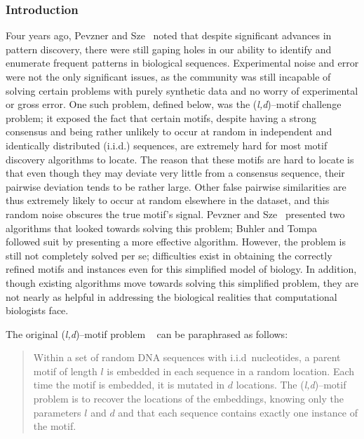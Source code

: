     \subsubsection{Introduction}
        Four years ago, Pevzner and Sze~\cite{pevzner2000combinatorial} noted
    that despite significant advances in pattern discovery,
    there were still gaping holes in our ability to identify and
    enumerate frequent patterns in biological sequences.
    Experimental noise and error were not the only significant issues,
    as the community was still incapable of solving certain
    problems with purely synthetic data and no worry of experimental or
    gross error.  One such problem, defined below, was the (\textit{l,d})--motif
    challenge problem; it exposed the fact that certain motifs, despite
    having a strong consensus and being rather unlikely to occur at random in
    independent and identically distributed (i.i.d.) sequences,
    are extremely hard for most motif discovery algorithms
    to locate.  The reason that these motifs are hard to locate is that even
    though they may deviate very little from a consensus sequence, their pairwise
    deviation tends to be rather large.  Other false pairwise similarities
    are thus extremely likely to occur at random elsewhere in the dataset, and
    this random noise obscures the true motif's signal.  Pevzner
    and Sze~\cite{pevzner2000combinatorial} presented two algorithms that looked towards solving this
    problem; Buhler and Tompa~\cite{buhler2001finding} followed suit by presenting a more effective
    algorithm.  However, the problem is still not completely solved per se;
    difficulties exist in obtaining the correctly refined motifs and instances even for this
    simplified model of biology.  In addition, though existing algorithms
    move towards solving this simplified problem,
    they are not nearly as helpful in addressing the biological realities
    that computational biologists face.

        The original (\textit{l,d})--motif problem \cite{pevzner2000combinatorial}~
    can be paraphrased as follows:
    \begin{quotation}
    Within a set of random DNA sequences with i.i.d\ nucleotides,
    a parent motif of length $l$ is embedded in each sequence in a
    random location.  Each time the motif is embedded, it is
    mutated in $d$ locations.  The (\textit{l,d})--motif problem is to recover
    the locations of the embeddings, knowing only the parameters $l$
    and $d$ and that each sequence contains exactly one
    instance of the motif.
    \end{quotation}

